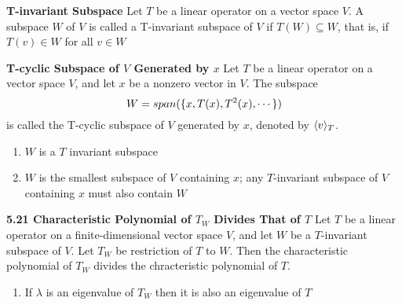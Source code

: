 \documentclass[11pt]{article}
\begin{document}
\begin{defn*}
    \textbf{T-invariant Subspace} Let $T$ be a linear operator on a vector space $V$. A subspace $W$ of $V$ is called a T-invariant subspace of $V$ if $T(W) \subseteq W$, that is, if $T(v)\in W$ for all $v\in W$
\end{defn*}

\begin{defn*}
    \textbf{T-cyclic Subspace of $V$ Generated by $x$} Let $T$ be a linear operator on a vector space $V$, and let $x$ be a nonzero vector in $V$. The subspace 
    \[
        W = \span{\{x, T(x), T^2(x), \cdots\}}    
    \]
    is called the T-cyclic subspace of $V$ generated by $x$, denoted by $\tinvariant{T}{v}$. 
    \begin{enumerate}
        \item $W$ is a $T$ invariant subspace 
        \item $W$ is the smallest subspace of $V$ containing $x$; any $T$-invariant subspace of $V$ containing $x$ must also contain $W$
    \end{enumerate}
\end{defn*}

 

\begin{theorem*}
    \textbf{5.21 Characteristic Polynomial of $T_W$ Divides That of $T$} Let $T$ be a linear operator on a finite-dimensional vector space $V$, and let $W$ be a $T$-invariant subspace of $V$. Let $T_W$ be restriction of $T$ to $W$. Then the characteristic polynomial of $T_W$ divides the chracteristic polynomial of $T$.
    \begin{enumerate}
        \item If $\lambda$ is an eigenvalue of $T_W$ then it is also an eigenvalue of $T$
    \end{enumerate}
\end{theorem*}

\end{document}
